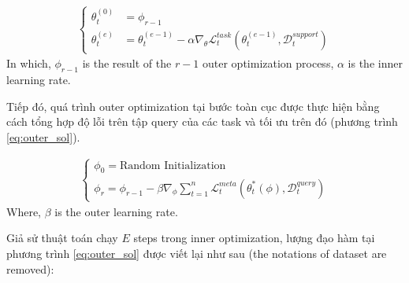 \documentclass[aps,prb,groupedaddress,twocolumn,showpacs,dvipdfmx,superscriptaddress,pdftex]{revtex4-2}
\begin{document}

\begin{align}
    \begin{cases}
        \theta_t^{(0)} &= \phi_{r-1} \\
        \theta_t^{(e)} &= \theta_t^{(e-1)} - \alpha \nabla_{\theta} \mathcal{L}^{task}_t\left( \theta_t^{(e-1)}, \mathcal{D}_t^{support} \right)
    \end{cases}
\end{align} In which, $\phi_{r-1}$ is the result of the $r-1$ outer optimization process, $\alpha$ is the inner learning rate.

\vspace{2mm}

Tiếp đó, quá trình outer optimization tại bước toàn cục được thực hiện bằng cách tổng hợp độ lỗi trên tập query của các task và tối ưu trên đó (phương trình \ref{eq:outer_sol}).


\begin{align}
    \begin{cases}
        \phi_0 = \text{Random Initialization}\\
        \phi_r = \phi_{r-1} - \beta \nabla_{\phi} \sum_{t=1}^n{\mathcal{L}^{meta}_t \left( \theta_t^*(\phi), \mathcal{D}_t^{query} \right)}
    \end{cases}
    \label{eq:outer_sol}
\end{align} Where, $\beta$ is the outer learning rate.

\vspace{2mm}

Giả sử thuật toán chạy $E$ steps trong inner optimization, lượng đạo hàm tại phương trình \ref{eq:outer_sol} được viết lại như sau (the notations of dataset are removed):
\end{document}
